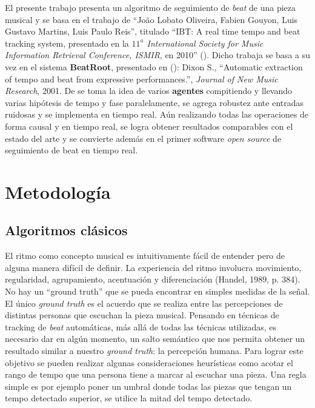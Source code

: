 \documentclass[12pt,a4paper,titlepage]{report}
\begin{document}
El presente trabajo presenta un algoritmo de seguimiento de \emph{beat} de una pieza musical y se basa en el trabajo de ``Jo\~ao Lobato Oliveira, Fabien Gouyon, Luis Gustavo Martins, Luis Paulo Reis'', titulado ``IBT: A real time tempo and beat tracking system, presentado en la \emph{$11^a$ International Society for Music Information Retrieval Conference, ISMIR}, en 2010'' (\cite{bib:el_posta}). Dicho trabaja se basa a su vez en el sistema \textbf{BeatRoot}, presentado en (\cite{bib:dixon}): Dixon S., ``Automatic extraction of tempo and beat from expressive performances.'', \emph{Journal of New Music Research}, 2001. De \cite{bib:dixon} se toma la idea de varios \textbf{agentes} compitiendo y llevando varias hipótesis de tempo y fase paralelamente, se agrega robustez ante entradas ruidosas y se implementa en tiempo real. Aún realizando todas las operaciones de forma causal y en tiempo real, se logra obtener resultados comparables con el estado del arte y se convierte además en el primer software \emph{open source} de seguimiento de beat en tiempo real.


\chapter{Metodología}
\label{sec:metodologia}

\section{Algoritmos clásicos}

El ritmo como concepto musical es intuitivamente fácil de entender pero de alguna manera difícil de definir. La experiencia del ritmo involucra movimiento, regularidad, agrupamiento, acentuación y diferenciación (Handel, 1989, p. 384). No hay un ``ground truth'' que se pueda encontrar en simples medidas de la señal. El único \emph{ground truth} es el acuerdo que se realiza entre las percepciones de distintas personas que escuchan la pieza musical. Pensando en técnicas de tracking de \emph{beat} automáticas, más allá de todas las técnicas utilizadas, es necesario dar en algún momento, un salto semántico que nos permita obtener un resultado similar a nuestro \emph{ground truth}: la percepción humana. Para lograr este objetivo se pueden realizar algunas consideraciones heurísticas como acotar el rango de tempo que una persona tiene a marcar al escuchar una pieza. Una regla simple es por ejemplo poner un umbral donde todas las piezas que tengan un tempo detectado superior, se utilice la mitad del tempo detectado.\\
\end{document}
